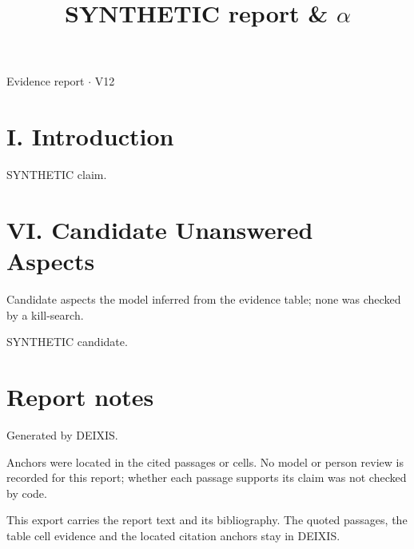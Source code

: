 \documentclass[journal]{IEEEtran}
\begin{document}
\title{SYNTHETIC report \& \ensuremath{\alpha}}

\maketitle

\noindent Evidence report \ensuremath{\cdot} V12

\section*{I. Introduction}

SYNTHETIC claim. \cite{Synth26}

\section*{VI. Candidate Unanswered Aspects}

Candidate aspects the model inferred from the evidence table; none was checked by a kill-search.

SYNTHETIC candidate.

\section*{Report notes}

Generated by DEIXIS.

Anchors were located in the cited passages or cells. No model or person review is recorded for this report; whether each passage supports its claim was not checked by code.

This export carries the report text and its bibliography. The quoted passages, the table cell evidence and the located citation anchors stay in DEIXIS.




\end{document}
